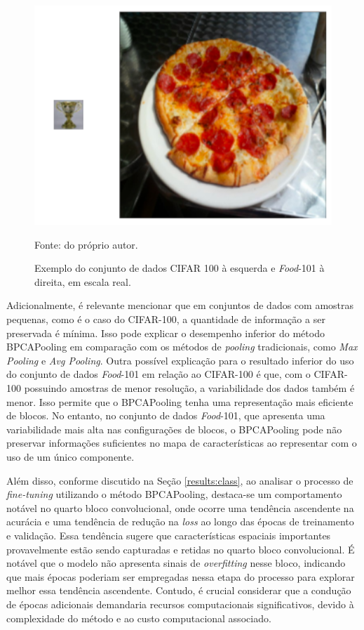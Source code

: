 \begin{figure}[H]
    \centering
    \caption{Exemplo do conjunto de dados CIFAR 100 à esquerda e \textit{Food}-101 à direita, em escala real.}
    \label{results:fig:datasets:0}
    \includegraphics[width=1\textwidth]{recursos/imagens/results/dataset_diff.png}

    Fonte: do próprio autor.
\end{figure}

Adicionalmente, é relevante mencionar que em conjuntos de dados com amostras pequenas, como é o caso do CIFAR-100, a quantidade de informação a ser preservada é mínima. Isso pode explicar o desempenho inferior do método BPCAPooling em comparação com os métodos de \textit{pooling} tradicionais, como \textit{Max Pooling} e \textit{Avg Pooling}. Outra possível explicação para o resultado inferior do uso do conjunto de dados \textit{Food}-101 em relação ao CIFAR-100 é que, com o CIFAR-100 possuindo amostras de menor resolução, a variabilidade dos dados também é menor. Isso permite que o BPCAPooling tenha uma representação mais eficiente de blocos. No entanto, no conjunto de dados \textit{Food}-101, que apresenta uma variabilidade mais alta nas configurações de blocos, o BPCAPooling pode não preservar informações suficientes no mapa de características ao representar com o uso de um único componente.

Além disso, conforme discutido na Seção \ref{results:class}, ao analisar o processo de \textit{fine-tuning} utilizando o método BPCAPooling, destaca-se um comportamento notável no quarto bloco convolucional, onde ocorre uma tendência ascendente na acurácia e uma tendência de redução na \textit{loss} ao longo das épocas de treinamento e validação. Essa tendência sugere que características espaciais importantes provavelmente estão sendo capturadas e retidas no quarto bloco convolucional. É notável que o modelo não apresenta sinais de \textit{overfitting} nesse bloco, indicando que mais épocas poderiam ser empregadas nessa etapa do processo para explorar melhor essa tendência ascendente. Contudo, é crucial considerar que a condução de épocas adicionais demandaria recursos computacionais significativos, devido à complexidade do método e ao custo computacional associado.

